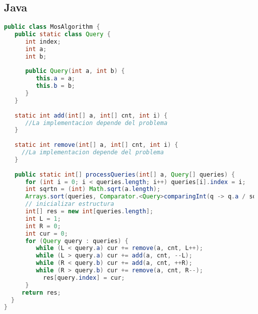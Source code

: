 \subsection{Java}
\begin{lstlisting}[language=Java]
public class MosAlgorithm {
   public static class Query {
      int index;
      int a;
      int b;
		
      public Query(int a, int b) {
         this.a = a;
         this.b = b;
      }
   }
   
   static int add(int[] a, int[] cnt, int i) {
      //La implementacion depende del problema
   }
	
   static int remove(int[] a, int[] cnt, int i) {
     //La implementacion depende del problema
   }
	
   public static int[] processQueries(int[] a, Query[] queries) {
      for (int i = 0; i < queries.length; i++) queries[i].index = i;
      int sqrtn = (int) Math.sqrt(a.length);
      Arrays.sort(queries, Comparator.<Query>comparingInt(q -> q.a / sqrtn).thenComparingInt(q -> q.b));
      // inicializar estructura
      int[] res = new int[queries.length];
      int L = 1;
      int R = 0;
      int cur = 0;
      for (Query query : queries) {
         while (L < query.a) cur += remove(a, cnt, L++);
         while (L > query.a) cur += add(a, cnt, --L);
         while (R < query.b) cur += add(a, cnt, ++R);
         while (R > query.b) cur += remove(a, cnt, R--);
           res[query.index] = cur;
      }
     return res;
  }
}
\end{lstlisting}